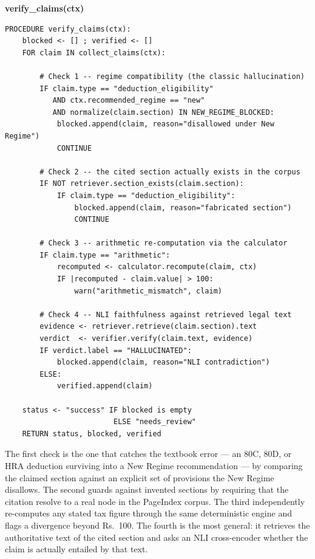 \documentclass[12pt, a4paper, oneside]{report}
\newcommand{\algname}[1]{\par\vspace{0.6em}\noindent\textbf{\ttfamily #1}\nopagebreak}
\begin{document}
\algname{verify\_claims(ctx)}
\begin{lstlisting}[style=pseudo]
PROCEDURE verify_claims(ctx):
    blocked <- [] ; verified <- []
    FOR claim IN collect_claims(ctx):

        # Check 1 -- regime compatibility (the classic hallucination)
        IF claim.type == "deduction_eligibility"
           AND ctx.recommended_regime == "new"
           AND normalize(claim.section) IN NEW_REGIME_BLOCKED:
            blocked.append(claim, reason="disallowed under New Regime")
            CONTINUE

        # Check 2 -- the cited section actually exists in the corpus
        IF NOT retriever.section_exists(claim.section):
            IF claim.type == "deduction_eligibility":
                blocked.append(claim, reason="fabricated section")
                CONTINUE

        # Check 3 -- arithmetic re-computation via the calculator
        IF claim.type == "arithmetic":
            recomputed <- calculator.recompute(claim, ctx)
            IF |recomputed - claim.value| > 100:
                warn("arithmetic_mismatch", claim)

        # Check 4 -- NLI faithfulness against retrieved legal text
        evidence <- retriever.retrieve(claim.section).text
        verdict  <- verifier.verify(claim.text, evidence)
        IF verdict.label == "HALLUCINATED":
            blocked.append(claim, reason="NLI contradiction")
        ELSE:
            verified.append(claim)

    status <- "success" IF blocked is empty
                         ELSE "needs_review"
    RETURN status, blocked, verified
\end{lstlisting}

The first check is the one that catches the textbook error --- an 80C, 80D, or
HRA deduction surviving into a New Regime recommendation --- by comparing the
claimed section against an explicit set of provisions the New Regime disallows.
The second guards against invented sections by requiring that the citation
resolve to a real node in the PageIndex corpus. The third independently
re-computes any stated tax figure through the same deterministic engine and
flags a divergence beyond Rs.~100. The fourth is the most general: it retrieves
the authoritative text of the cited section and asks an NLI cross-encoder
whether the claim is actually entailed by that text.
\end{document}
